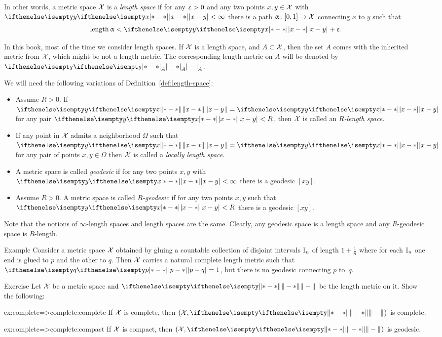In other words, a metric space $\mathcal{X}$ is a
\emph{length space}
if for any $\upvarepsilon>0$ and any two points $x,y\in \spc{X}$ with $\dist{x}{y}{}<\infty$ there is a path $\alpha\:[0,1]\to\spc{X}$ connecting $x$ to $y$ such that 
\[\length\alpha<\dist{x}{y}{}+\eps.\]

In this book, most of the time we consider length spaces.
If $\mathcal{X}$ is a length space, 
and $A\subset \spc{X}$, then the set $A$ comes with the inherited metric from $\mathcal{X}$, 
which might be not a length metric.
The corresponding length metric on $A$ will be denoted by $\dist{}{}{A}$.


We will need the following variations of Definition~\ref{def:length-space}:

\begin{itemize}
\item Assume $R>0$.
If $\yetdist{x}{y}{}=\dist{x}{y}{}$ for any pair $\dist{x}{y}{}<R$, then $\mathcal{X}$ is called an \emph{$R$-length space}.
\item If any point in $\mathcal{X}$ admits a neighborhood  $\Omega$ such that $\yetdist{x}{y}{}=\dist{x}{y}{}$ for any pair of points $x,y\in \Omega$
then  $\mathcal{X}$ is called a \emph{locally length space}.
\item A metric space is called 
\emph{geodesic}
if for any two points $x,y$ with $\dist{x}{y}{}<\infty$ there is a geodesic $[x y]$.
\item Assume $R>0$. A metric space is called 
\emph{$R$-geodesic}
if for any two points $x,y$ such that $\dist{x}{y}{}<R$ there is a geodesic $[x y]$.
\end{itemize}

Note that the notions of $\infty$-length spaces and length spaces are the same.
Clearly, any geodesic space is a length space 
and any $R$-geodesic space is $R$-length.

\begin{thm}{Example} 
Consider a metric space $\mathcal{X}$ obtained by gluing a countable collection of disjoint intervals $\mathbb{I}_n$ of length $1+\tfrac1n$ where for each $\mathbb{I}_n$ one end is glued to $p$ and the other to $q$.
Then $\mathcal{X}$ carries a natural complete length metric such that $\dist{p}{q}{}=1$, but there is no geodesic connecting $p$ to~$q$.
\end{thm}

\begin{thm}{Exercise}\label{ex:complete=>complete}
Let $\mathcal{X}$ be a metric space
and $\yetdist{}{}{}$ be the length metric on it.
Show the following:
\begin{subthm}{ex:complete=>complete:complete}
If $\mathcal{X}$  is complete, then  $(\spc{X},\yetdist{}{}{})$ is complete.
\end{subthm}

\begin{subthm}{ex:complete=>complete:compact}
If $\mathcal{X}$ is compact, then $(\spc{X},\yetdist{}{}{})$ is geodesic.
\end{subthm}
\end{thm}


